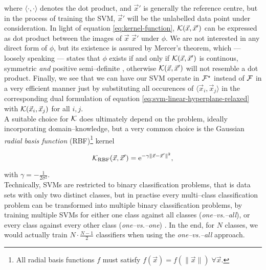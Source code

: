 where $\langle \cdot, \cdot \rangle$ denotes the dot product, and $\vec x'$ is generally the reference centre, but in the process of training the SVM, $\vec x'$ will be the unlabelled data point under consideration. In light of equation \eqref{eq:kernel-function}, $\mathcal{K}(\vec x, \vec x')$ can be expressed as dot product between the images of $\vec x$ \resp $\vec x'$ under $\phi$. We are not interested in any direct form of $\phi$, but its existence is assured by Mercer's theorem, which --- loosely speaking --- states that $\phi$ exists if and only if $\mathcal{K}(\vec x, \vec x')$ is continous, symmetric \emph{and} positive semi--definite \citep{mercer1909}, otherwise $\mathcal{K}(\vec x, \vec x')$ will not resemble a dot product. Finally, we see that we can have our SVM operate in $\mathcal{F}^\star$ instead of $\mathcal{F}$ in a very efficient manner just by substituting all occurences of $\langle \vec x_i, \vec x_j \rangle$ in the corresponding dual formulation of equation \eqref{eq:svm-linear-hyperplane-relaxed} with $\mathcal{K}({\vec x_i, \vec x_j})$ for all $i,j$. \\
 
A suitable choice for $\mathcal{K}$ does ultimately depend on the problem, ideally incorporating domain--knowledge, but a very common choice is the Gaussian \emph{radial basis function} (RBF)\footnote{All radial basis functions $f$ must satisfy $f(\vec x) = f(\|\vec x\|) \; \forall \vec x$.} kernel

\begin{equation}
\label{eq:rbf}
\mathcal{K}_{\text{RBF}}(\vec x, \vec x') = \mathrm{e}^{-\gamma \| \vec x - \vec x' \|^2},
\end{equation}

with $\gamma = -\frac{1}{2 \sigma^2}$.\\


Technically, SVMs are restricted to binary classification problems, that is data sets with only two distinct classes, but in practise every multi--class classification problem can be transformed into multiple binary classification problems, \eg by training multiple SVMs for either one class against all classes (\emph{one--vs.--all}), or every class against every other class (\emph{one--vs.--one}) \citep{knerr1990}. In the end, for $N$ classes, we would actually train $N \cdot \frac{N-1}{2}$ classifiers when using the \emph{one--vs.--all} approach.



